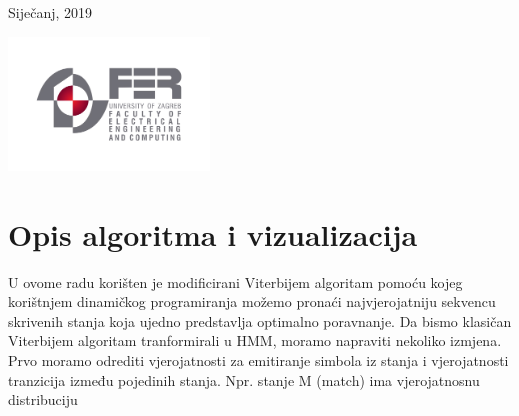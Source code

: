 \documentclass[a4paper]{article}
\begin{document}
\begin{titlepage}
	
	
	\vfill\vfill\vfill %
	
	{\large Siječanj, 2019} %
	
	
	\vfill\vfill
	\includegraphics[width=0.4\textwidth]{fer_logo.jpg}\\[1cm] %
	 
	
	\vfill %
	
\end{titlepage}






\section{Opis algoritma i vizualizacija}
U ovome radu korišten je modificirani Viterbijem algoritam pomoću kojeg korištnjem dinamičkog programiranja možemo pronaći najvjerojatniju sekvencu skrivenih stanja koja ujedno predstavlja optimalno poravnanje.
Da bismo klasičan Viterbijem algoritam tranformirali u HMM, moramo napraviti nekoliko izmjena. Prvo moramo odrediti vjerojatnosti za emitiranje simbola iz stanja i vjerojatnosti tranzicija između pojedinih stanja. Npr. stanje M (match)  ima vjerojatnosnu distribuciju 
\end{document}
